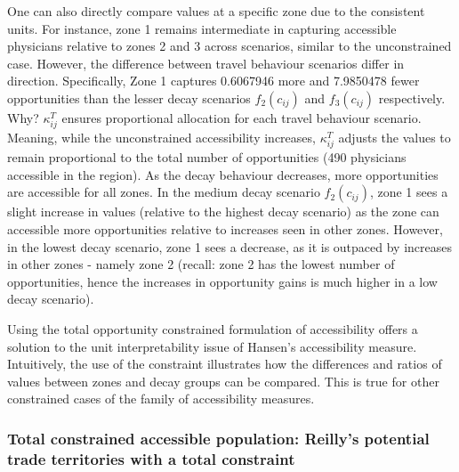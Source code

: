\documentclass[
  10pt,
  letterpaper,
]{article}
\begin{document}
One can also directly compare values at a specific zone due to the
consistent units. For instance, zone 1 remains intermediate in capturing
accessible physicians relative to zones 2 and 3 across scenarios,
similar to the unconstrained case. However, the difference between
travel behaviour scenarios differ in direction. Specifically, Zone 1
captures 0.6067946 more and 7.9850478 fewer opportunities than the
lesser decay scenarios \(f_2(c_{ij})\) and \(f_3(c_{ij})\) respectively.
Why? \(\kappa_{ij}^T\) ensures proportional allocation for each travel
behaviour scenario. Meaning, while the unconstrained accessibility
increases, \(\kappa_{ij}^T\) adjusts the values to remain proportional
to the total number of opportunities (490 physicians accessible in the
region). As the decay behaviour decreases, more opportunities are
accessible for all zones. In the medium decay scenario \(f_2(c_{ij})\),
zone 1 sees a slight increase in values (relative to the highest decay
scenario) as the zone can accessible more opportunities relative to
increases seen in other zones. However, in the lowest decay scenario,
zone 1 sees a decrease, as it is outpaced by increases in other zones -
namely zone 2 (recall: zone 2 has the lowest number of opportunities,
hence the increases in opportunity gains is much higher in a low decay
scenario).

Using the total opportunity constrained formulation of accessibility
offers a solution to the unit interpretability issue of Hansen's
\citep{hansen1959} accessibility measure. Intuitively, the use of the
constraint illustrates how the differences and ratios of values between
zones and decay groups can be compared. This is true for other
constrained cases of the family of accessibility measures.

\subsubsection{Total constrained accessible population: Reilly's
potential trade territories with a total
constraint}\label{total-constrained-accessible-population-reillys-potential-trade-territories-with-a-total-constraint}
\end{document}
